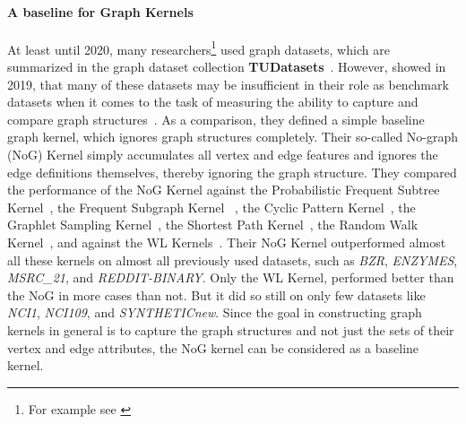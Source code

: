 		\paragraph{A baseline for Graph Kernels}
		At least until 2020, many researchers\footnote{For example see \cite{2007_Wale_CONF, 2016_Kriege_NIPS, 2011_Shervashidze_JMLR, 2015_Yanardag_CONF, 2020_Siglidis_CONF, 2020_Dwivedi_CONF, 2021_Schulz_CONF}}\; used graph datasets, which are summarized in the graph dataset collection \textbf{TUDatasets}~\cite{2016_Kersting_CONF, 2020_Morris_CONF}.		
		However, \citeauthor{2019_Schulz_CONF} showed in 2019, that many of these datasets may be insufficient in their role as benchmark datasets when it comes to the task of measuring the ability to capture and compare graph structures~\cite{2019_Schulz_CONF}.
		As a comparison, they defined a simple baseline graph kernel, which ignores graph structures completely.
		Their so-called No-graph (NoG) Kernel simply accumulates all vertex and edge features and ignores the edge definitions themselves, thereby ignoring the graph structure.
		They compared the performance of the NoG Kernel against the Probabilistic Frequent Subtree Kernel~\cite{2017_Welke_CONF}, the Frequent Subgraph Kernel ~\cite{2004_Kuramochi_IEEE}, the Cyclic Pattern Kernel~\cite{2004_Horvath_KDD}, the Graphlet Sampling Kernel~\cite{2009_Shervashidze_PMLR}, the Shortest Path Kernel~\cite{2005_Borgwardt_IEEE}, the Random Walk Kernel~\cite{2003_Gaertner_CONF}, and against the WL Kernels~\cite{2011_Shervashidze_JMLR}.
		Their NoG Kernel outperformed almost all these kernels on almost all previously used datasets, such as \textit{BZR}, \textit{ENZYMES}, \textit{MSRC\_21}, and \textit{REDDIT-BINARY}\useFN\fnname.
		Only the WL Kernel, performed better than the NoG in more cases than not.
		But it did so still on only few datasets like \textit{NCI1}, \textit{NCI109}, and \textit{SYNTHETICnew}\useFN\fnname.
		Since the goal in constructing graph kernels in general is to capture the graph structures and not just the sets of their vertex and edge attributes, the NoG kernel can be considered as a baseline kernel.
				
